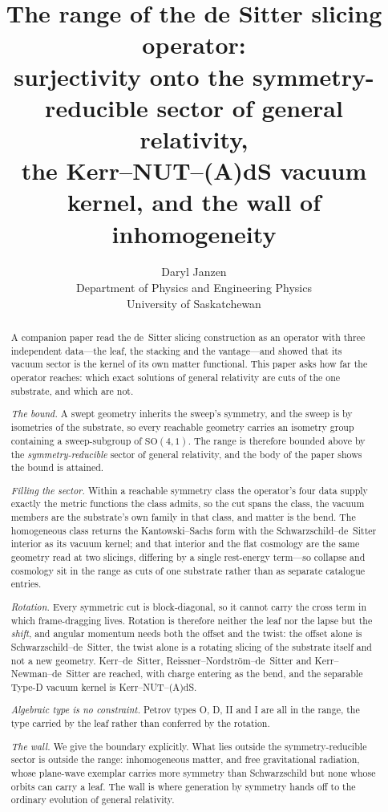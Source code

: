 \documentclass[11pt,a4paper]{article}
\title{The range of the de Sitter slicing operator:\\
\large surjectivity onto the symmetry-reducible sector of general relativity,\\
the Kerr--NUT--(A)dS vacuum kernel, and the wall of inhomogeneity}
\author{Daryl Janzen\\
\small Department of Physics and Engineering Physics\\
\small University of Saskatchewan}
\date{}
\theoremstyle{definition}
\newcommand{\so}{\mathrm{SO}(4,1)}
\begin{document}
\maketitle

\begin{abstract}
A companion paper read the de~Sitter slicing construction as an operator with three independent data---the leaf, the stacking and the vantage---and showed that its vacuum sector is the kernel of its own matter functional. This paper asks how far the operator reaches: which exact solutions of general relativity are cuts of the one substrate, and which are not.

\emph{The bound.} A swept geometry inherits the sweep's symmetry, and the sweep is by isometries of the substrate, so every reachable geometry carries an isometry group containing a sweep-subgroup of $\so$. The range is therefore bounded above by the \emph{symmetry-reducible} sector of general relativity, and the body of the paper shows the bound is attained.

\emph{Filling the sector.} Within a reachable symmetry class the operator's four data supply exactly the metric functions the class admits, so the cut spans the class, the vacuum members are the substrate's own family in that class, and matter is the bend. The homogeneous class returns the Kantowski--Sachs form with the Schwarzschild--de~Sitter interior as its vacuum kernel; and that interior and the flat cosmology are the same geometry read at two slicings, differing by a single rest-energy term---so collapse and cosmology sit in the range as cuts of one substrate rather than as separate catalogue entries.

\emph{Rotation.} Every symmetric cut is block-diagonal, so it cannot carry the cross term in which frame-dragging lives. Rotation is therefore neither the leaf nor the lapse but the \emph{shift}, and angular momentum needs both the offset and the twist: the offset alone is Schwarzschild--de~Sitter, the twist alone is a rotating slicing of the substrate itself and not a new geometry. Kerr--de~Sitter, Reissner--Nordstr\"om--de~Sitter and Kerr--Newman--de~Sitter are reached, with charge entering as the bend, and the separable Type-D vacuum kernel is Kerr--NUT--(A)dS.

\emph{Algebraic type is no constraint.} Petrov types O, D, II and I are all in the range, the type carried by the leaf rather than conferred by the rotation.

\emph{The wall.} We give the boundary explicitly. What lies outside the symmetry-reducible sector is outside the range: inhomogeneous matter, and free gravitational radiation, whose plane-wave exemplar carries more symmetry than Schwarzschild but none whose orbits can carry a leaf. The wall is where generation by symmetry hands off to the ordinary evolution of general relativity.
\end{abstract}
\end{document}
